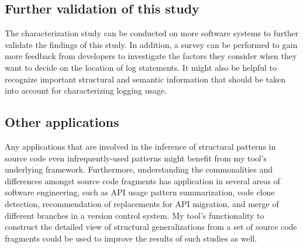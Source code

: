 \subsection{Further validation of this study}
The characterization study can be conducted on more software systems to further validate the findings of this study. In addition, a survey can be performed to gain more feedback from developers to investigate the factors they consider when they want to decide on the location of log statements. It might also be helpful to recognize important structural and semantic information that should be taken into account for characterizing logging usage.

\subsection{Other applications}
Any applications that are involved in the inference of structural patterns in source code even infrequently-used patterns might benefit from my tool's underlying framework.
Furthermore, understanding the commonalities and differences amongst source code fragments has application in several areas of software engineering, such as API usage pattern summarization, code clone detection, recommendation of replacements for API migration, and merge of different branches in a version control system. My tool's functionality to construct the detailed view of structural generalizations from a set of source code fragments could be used to improve the results of such studies as well.



